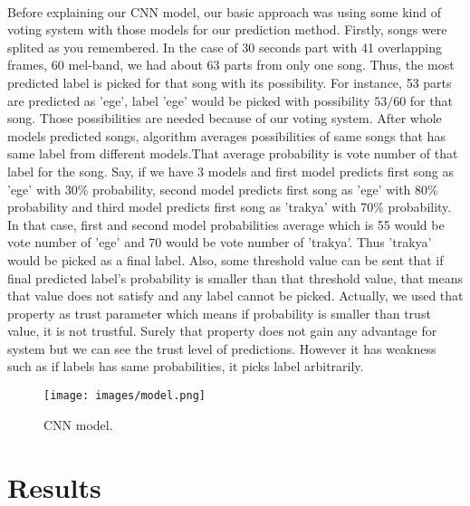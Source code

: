\documentclass[10pt,twocolumn,letterpaper]{article}
\begin{document}
  \paragraph{} Before explaining our CNN model, our basic approach was using some kind of voting system with those models for our prediction method. Firstly, songs were splited as you remembered. In the case of 30 seconds part with 41 overlapping frames, 60 mel-band, we had about 63 parts from only one song. Thus, the most predicted label is picked for that song with its possibility. For instance, 53 parts are predicted as 'ege', label 'ege' would be picked with possibility $53/60$ for that song. Those possibilities are needed because of our voting system. After whole models predicted songs, algorithm averages possibilities of same songs that has same label from different models.That average probability is vote number of that label for the song. Say, if we have 3 models and first model predicts first song as 'ege' with 30\% probability, second model predicts first song as 'ege' with 80\% probability and third model predicts first song as 'trakya' with 70\% probability. In that case, first and second model probabilities average which is 55 would be vote number of 'ege' and 70 would be vote number of 'trakya'. Thus 'trakya' would be picked as a final label. Also, some threshold value can be sent that if final predicted label's probability is smaller than that threshold value, that means that value does not satisfy and any label cannot be picked. Actually, we used that property as trust parameter which means if probability is smaller than trust value, it is not trustful. Surely that property does not gain any advantage for system but we can see the trust level of predictions. However it has weakness such as if labels has same probabilities, it picks label arbitrarily.             
  \begin{figure}[H]
    \begin{center}
    \texttt{[image: images/model.png]}
    \end{center}  
       \caption{CNN model.}
    \label{fig:model}
    \label{fig:onecol}
  \end{figure} 
  \section{Results}
\end{document}
